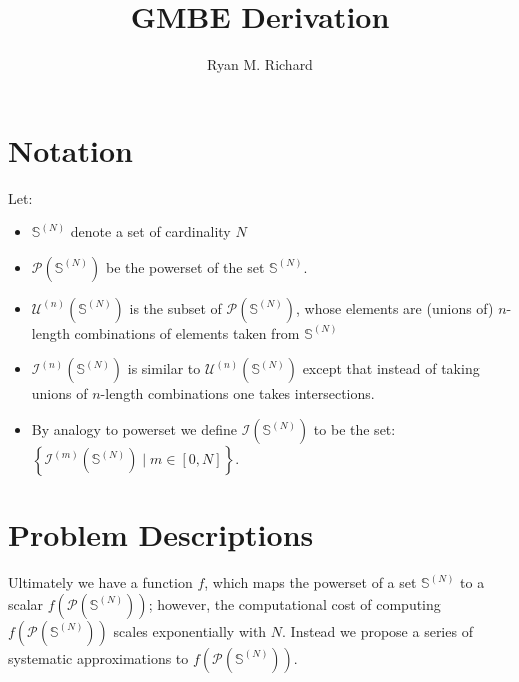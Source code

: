 \documentclass[11pt]{article}
\title{GMBE Derivation}
\author{Ryan M. Richard}
\newcommand{\fxn}[1]{f\left(#1\right)}
\newcommand{\pset}[1]{\mathcal{P}\left(#1\right)}
\newcommand{\mcn}[2]{\mathcal{U}^{(#1)}\left(#2\right)}
\newcommand{\ints}[2]{\mathcal{I}^{(#1)}\left(#2\right)}
\newcommand{\iset}[1]{\mathcal{I}\left(#1\right)}
\newcommand{\sets}{\mathbb{S}^{(N)}}
\newcommand{\fxns}{\fxn{\pset{\sets}}}
\begin{document}
\maketitle

\section{Notation}

Let:

\begin{itemize}
	\item $\sets$ denote a set of cardinality $N$
	\item $\pset{\sets}$ be the powerset of the set $\sets$.
	\item $\mcn{n}{\sets}$ is the subset of $\pset{\sets}$, whose elements are
          (unions of) $n$-length combinations of elements taken from $\sets$
    \item $\ints{n}{\sets}$ is similar to $\mcn{n}{\sets}$ except that instead
         of taking unions of $n$-length combinations one takes intersections.
    \item By analogy to powerset we define $\iset{\sets}$ to be the set: $\left\lbrace\ints{m}{\sets} \mid m\in[0,N]\right\rbrace$.
\end{itemize}

\section{Problem Descriptions}

Ultimately we have a function $f$, which maps the powerset of a set $\sets$ to a
scalar $\fxns$; however, the computational cost of
computing $\fxns$ scales exponentially with $N$. Instead we propose a series of
systematic approximations to $\fxns$.
\end{document}
